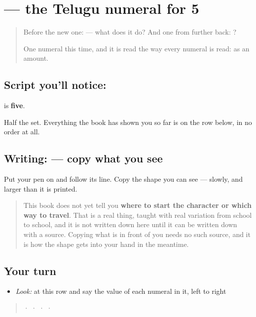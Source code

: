 \section[\texorpdfstring{\te{౫} (5)}{౫ (5)}]{ — the Telugu numeral for 5}

\label{lesson:TE-S144-digit-5}



\begin{quote}
Before the new one:  — what does it do? And one from further back: ?

One numeral this time, and it is read the way every numeral is read: as an amount.
\end{quote}

\subsection*{Script you'll notice: }
\textbf{} is \textbf{five}.

Half the set. Everything the book has shown you so far is on the row below, in no order at all.

\subsection*{Writing:  — copy what you see}
Put your pen on  and follow its line. Copy the shape you can see — slowly, and larger than it is printed.

\begin{quote}
This book does not yet tell you \textbf{where to start the character or which way to travel}. That is a real thing, taught with real variation from school to school, and it is not written down here until it can be written down with a source. Copying what is in front of you needs no such source, and it is how the shape gets into your hand in the meantime.
\end{quote}

\subsection*{Your turn}
\begin{itemize}
\raggedright
  \item \emph{Look:} at this row and say the value of each numeral in it, left to right
\end{itemize}

\begin{quote}
  ·    ·    ·    ·  
\end{quote}

